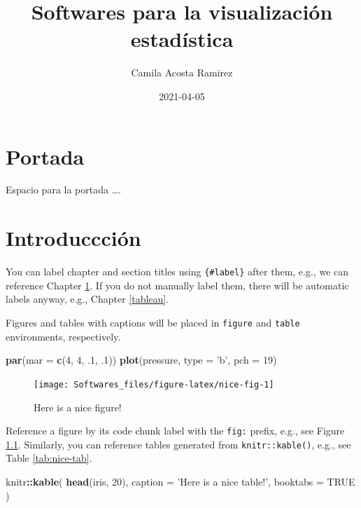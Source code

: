 \documentclass[
]{book}
\title{Softwares para la visualización estadística}
\author{Camila Acosta Ramirez}
\date{2021-04-05}
\newenvironment{Shaded}{\begin{snugshade}}{\end{snugshade}}
\newcommand{\DataTypeTok}[1]{\textcolor[rgb]{0.13,0.29,0.53}{#1}}
\newcommand{\DecValTok}[1]{\textcolor[rgb]{0.00,0.00,0.81}{#1}}
\newcommand{\FloatTok}[1]{\textcolor[rgb]{0.00,0.00,0.81}{#1}}
\newcommand{\KeywordTok}[1]{\textcolor[rgb]{0.13,0.29,0.53}{\textbf{#1}}}
\newcommand{\NormalTok}[1]{#1}
\newcommand{\OperatorTok}[1]{\textcolor[rgb]{0.81,0.36,0.00}{\textbf{#1}}}
\newcommand{\OtherTok}[1]{\textcolor[rgb]{0.56,0.35,0.01}{#1}}
\newcommand{\StringTok}[1]{\textcolor[rgb]{0.31,0.60,0.02}{#1}}
\begin{document}
\maketitle

{
\setcounter{tocdepth}{1}
\tableofcontents
}
\hypertarget{portada}{%
\chapter*{Portada}\label{portada}}

Espacio para la portada \ldots.

\hypertarget{intro}{%
\chapter{Introduccción}\label{intro}}

You can label chapter and section titles using \texttt{\{\#label\}} after them, e.g., we can reference Chapter \ref{intro}. If you do not manually label them, there will be automatic labels anyway, e.g., Chapter \ref{tableau}.

Figures and tables with captions will be placed in \texttt{figure} and \texttt{table} environments, respectively.

\begin{Shaded}
\begin{Highlighting}[]
\KeywordTok{par}\NormalTok{(}\DataTypeTok{mar =} \KeywordTok{c}\NormalTok{(}\DecValTok{4}\NormalTok{, }\DecValTok{4}\NormalTok{, }\FloatTok{.1}\NormalTok{, }\FloatTok{.1}\NormalTok{))}
\KeywordTok{plot}\NormalTok{(pressure, }\DataTypeTok{type =} \StringTok{'b'}\NormalTok{, }\DataTypeTok{pch =} \DecValTok{19}\NormalTok{)}
\end{Highlighting}
\end{Shaded}

\begin{figure}

{\centering \texttt{[image: Softwares\_files/figure-latex/nice-fig-1]} 

}

\caption{Here is a nice figure!}\label{fig:nice-fig}
\end{figure}

Reference a figure by its code chunk label with the \texttt{fig:} prefix, e.g., see Figure \ref{fig:nice-fig}. Similarly, you can reference tables generated from \texttt{knitr::kable()}, e.g., see Table \ref{tab:nice-tab}.

\begin{Shaded}
\begin{Highlighting}[]
\NormalTok{knitr}\OperatorTok{::}\KeywordTok{kable}\NormalTok{(}
  \KeywordTok{head}\NormalTok{(iris, }\DecValTok{20}\NormalTok{), }\DataTypeTok{caption =} \StringTok{'Here is a nice table!'}\NormalTok{,}
  \DataTypeTok{booktabs =} \OtherTok{TRUE}
\NormalTok{)}
\end{Highlighting}
\end{Shaded}
\end{document}
